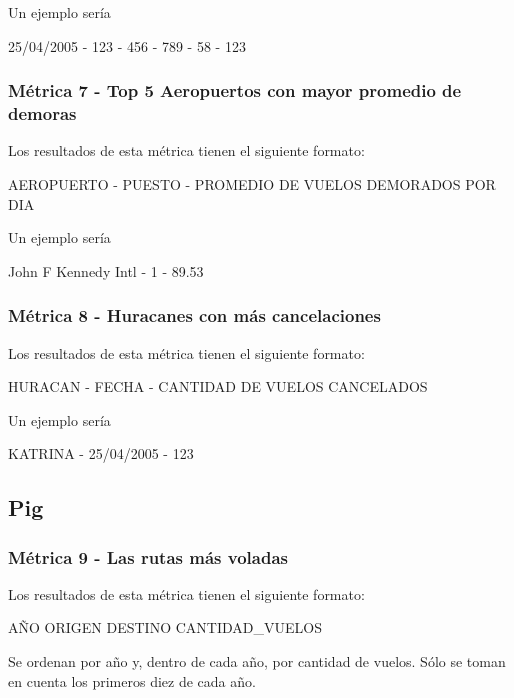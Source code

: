 \documentclass[a4paper,10pt]{article}
\begin{document}
            Un ejemplo sería\\
            \begin{center}
            25/04/2005 - 123 - 456 - 789 - 58 - 123\\
            \end{center}
        \subsubsection{Métrica 7 - Top 5 Aeropuertos con mayor promedio de demoras}
        Los resultados de esta métrica tienen el siguiente formato:\\
            \begin{center}
                AEROPUERTO - PUESTO - PROMEDIO DE VUELOS DEMORADOS POR DIA
            \end{center}

            Un ejemplo sería\\
            \begin{center}
            John F Kennedy Intl - 1 - 89.53\\
            \end{center}
        \subsubsection{Métrica 8 - Huracanes con más cancelaciones}
        Los resultados de esta métrica tienen el siguiente formato:\\
            \begin{center}
                HURACAN - FECHA - CANTIDAD DE VUELOS CANCELADOS
            \end{center}

            Un ejemplo sería\\
            \begin{center}
            KATRINA - 25/04/2005 - 123\\
            \end{center}


    \subsection{Pig}
       \subsubsection{Métrica 9 - Las rutas más voladas}
            Los resultados de esta métrica tienen el siguiente formato:\\
            \begin{center}
                AÑO ORIGEN DESTINO CANTIDAD\_VUELOS
            \end{center}
            Se ordenan por año y, dentro de cada año, por cantidad de vuelos. Sólo se toman en cuenta los primeros diez de cada año.
\end{document}
